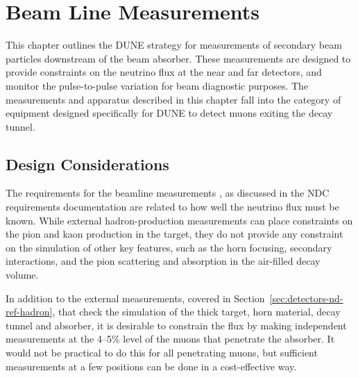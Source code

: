 \section{Beam Line Measurements} 
\label{sec:detectors-nd-ref-blm}

This chapter outlines the DUNE strategy for measurements of secondary
beam particles downstream of  the beam absorber. 
These measurements are designed to provide constraints 
on the neutrino flux at the near and far
detectors, and monitor the pulse-to-pulse variation
 for beam diagnostic purposes. 
The measurements and apparatus described in this chapter fall into
the category of equipment designed specifically for DUNE to
detect muons exiting the decay tunnel. 

\subsection{Design Considerations}
\label{subsec:detectors-nd-blm-design}

\begin{sloppypar}
The requirements for the beamline measurements
%
, as discussed in the NDC requirements documentation\cite{lbnfdune-cdr-req} 
%
are related to how well the neutrino flux must be known.
While external hadron-production measurements can place 
constraints on the pion and kaon production in the target, they do not 
provide any constraint on the simulation of other key features, such 
as the horn focusing, secondary interactions, and the 
pion scattering and absorption in the air-filled decay volume. 

In addition to the external measurements, covered in
Section~\ref{sec:detectors-nd-ref-hadron}, that check the
simulation of the thick target, horn material, decay tunnel and
absorber, it is desirable to constrain the flux by making independent
measurements at the 4--5\% level of the muons that penetrate the
absorber. It would not be practical to do this for all penetrating
muons, but sufficient measurements at a few positions can be done in a
cost-effective way.
\end{sloppypar}
%

